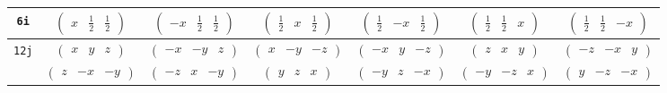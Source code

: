 \documentclass[fleqn,9pt,landscape]{jsarticle}
\begin{document}
\begin{center}
\begin{longtable}{ccccccc}
{\tt 6i} & $ \begin{pmatrix} x & \frac{1}{2} & \frac{1}{2} \end{pmatrix} $ & $ \begin{pmatrix} - x & \frac{1}{2} & \frac{1}{2} \end{pmatrix} $ & $ \begin{pmatrix} \frac{1}{2} & x & \frac{1}{2} \end{pmatrix} $ & $ \begin{pmatrix} \frac{1}{2} & - x & \frac{1}{2} \end{pmatrix} $ & $ \begin{pmatrix} \frac{1}{2} & \frac{1}{2} & x \end{pmatrix} $ & $ \begin{pmatrix} \frac{1}{2} & \frac{1}{2} & - x \end{pmatrix} $ \\ \hline
{\tt 12j} & $ \begin{pmatrix} x & y & z \end{pmatrix} $ & $ \begin{pmatrix} - x & - y & z \end{pmatrix} $ & $ \begin{pmatrix} x & - y & - z \end{pmatrix} $ & $ \begin{pmatrix} - x & y & - z \end{pmatrix} $ & $ \begin{pmatrix} z & x & y \end{pmatrix} $ & $ \begin{pmatrix} - z & - x & y \end{pmatrix} $ \\
& $ \begin{pmatrix} z & - x & - y \end{pmatrix} $ & $ \begin{pmatrix} - z & x & - y \end{pmatrix} $ & $ \begin{pmatrix} y & z & x \end{pmatrix} $ & $ \begin{pmatrix} - y & z & - x \end{pmatrix} $ & $ \begin{pmatrix} - y & - z & x \end{pmatrix} $ & $ \begin{pmatrix} y & - z & - x \end{pmatrix} $ \\
\end{longtable}
\end{center}
\end{document}
